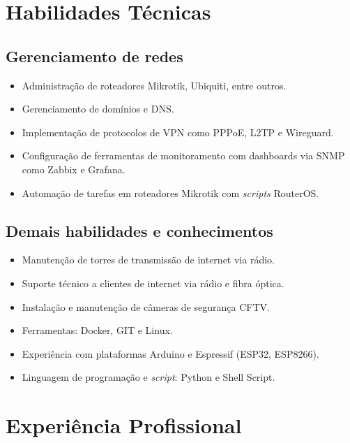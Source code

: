 \documentclass{cv}
\begin{document}
\pagestyle{empty}

\maketitle

\section{Habilidades Técnicas}

\subsection{Gerenciamento de redes}

\begin{itemize}
  \item Administração de roteadores Mikrotik, Ubiquiti, entre outros.
  \item Gerenciamento de domínios e DNS.
  \item Implementação de protocolos de VPN como PPPoE, L2TP e Wireguard.
  \item Configuração de ferramentas de monitoramento com dashboards via SNMP como Zabbix e Grafana.
  \item Automação de tarefas em roteadores Mikrotik com \textit{scripts} RouterOS.
\end{itemize}

\subsection{Demais habilidades e conhecimentos}

\begin{itemize}
  \item Manutenção de torres de transmissão de internet via rádio.
  \item Suporte técnico a clientes de internet via rádio e fibra óptica.
  \item Instalação e manutenção de câmeras de segurança CFTV.
  \item Ferramentas: Docker, GIT e Linux.
  \item Experiência com plataformas Arduino e Espressif (ESP32, ESP8266).
  \item Linguagem de programação e \textit{script}: Python e Shell Script.
\end{itemize}

\section{Experiência Profissional}
\end{document}
